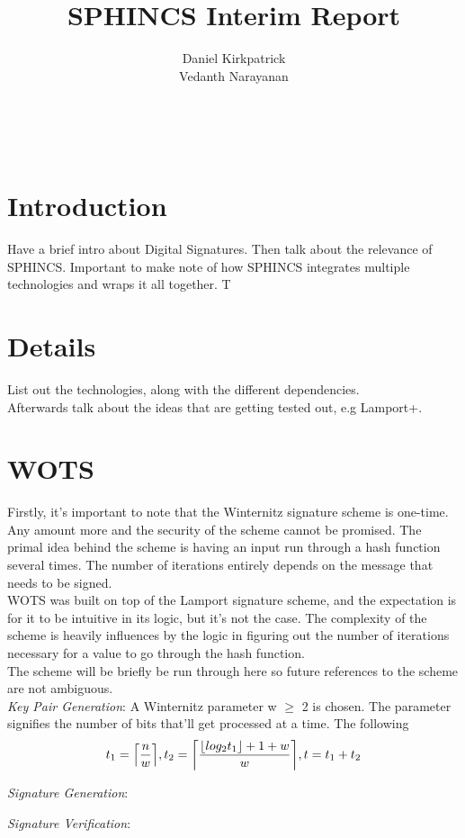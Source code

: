 \documentclass[]{scrartcl}
\title{SPHINCS Interim Report}
\author{Daniel Kirkpatrick\\Vedanth Narayanan}
\makeatletter
\DeclarePairedDelimiter\ceil{\lceil}{\rceil}
\renewcommand{\maketitle}{ %
	\begin{center} %
		{\LARGE\@title} %
		
		\vspace{15pt} %
		{\large\@author} %
		\\\@date %
		
	\end{center}
}
\makeatother
\begin{document}
\maketitle


\section*{Introduction}
Have a brief intro about Digital Signatures. Then talk about the relevance of SPHINCS. Important to make note of how SPHINCS integrates multiple technologies and wraps it all together.
T

\section*{Details}
List out the technologies, along with the different dependencies.\\
Afterwards talk about the ideas that are getting tested out, e.g Lamport+.

\section*{WOTS}
Firstly, it's important to note that the Winternitz signature scheme is one-time. Any amount more and the security of the scheme cannot be promised. The primal idea behind the scheme is having an input run through a hash function several times. The number of iterations entirely depends on the message that needs to be signed.\\
WOTS was built on top of the Lamport signature scheme, and the expectation is for it to be intuitive in its logic, but it's not the case. The complexity of the scheme is heavily influences by the logic in figuring out the number of iterations necessary for a value to go through the hash function.\\
The scheme will be briefly be run through here so future references to the scheme are not ambiguous.\\
\textit{Key Pair Generation}: A Winternitz parameter w $\geq$ 2 is chosen. The parameter signifies the number of bits that'll get processed at a time. The following 
\begin{equation}
t_{1} = \ceil*{\frac{n}{w}}, t_{2} = \ceil*{\frac{\lfloor log_2{t_{1}} \rfloor + 1 + w}{w}} , t = t_{1} + t_{2}
\end{equation}

\textit{Signature Generation}: 

\textit{Signature Verification}: 
\end{document}

